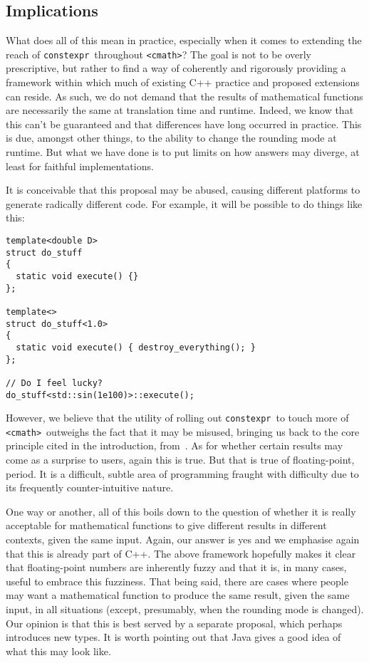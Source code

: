\documentclass[prd,twocolumn,amsmath,amssymb,nofootinbib,eqsecnum]{revtex4-1}
\newcommand{\constexpr}{\code{constexpr}\xspace}
\newcommand{\code}[1]{{\tt #1}}
\newcommand{\header}[1]{{\tt <#1>}}
\newcommand{\cmath}{\header{cmath}}
\begin{document}
\subsection{Implications}

What does all of this mean in practice, especially when it comes to extending the reach of \constexpr\ throughout \cmath? The goal is not to be overly prescriptive, but rather to find a way of coherently and rigorously providing a framework  within which much of existing C++ practice and proposed extensions can reside. As such, we do not demand that the results of mathematical functions are necessarily the same at translation time and runtime. Indeed, we know that this can't be guaranteed and that differences have long occurred in practice. This is due, amongst other things, to the ability to change the rounding mode at runtime. But what we have done is to put limits on how answers may diverge, at least for faithful implementations.

It is conceivable that this proposal may be abused, causing different platforms to generate radically
different code. For example, it will be possible to do things like this:
\begin{verbatim}
template<double D>
struct do_stuff
{
  static void execute() {}
};

template<>
struct do_stuff<1.0>
{
  static void execute() { destroy_everything(); }
};

// Do I feel lucky?
do_stuff<std::sin(1e100)>::execute();
\end{verbatim}

However, we believe that the utility of rolling out \constexpr\ to touch more of \cmath\ outweighs the fact that it may be misused, bringing us back to the core principle cited in the introduction, from~\cite{DandE}.
As for whether certain results may come as a surprise to users, again this is true. But that
is true of floating-point, period. It is a difficult, subtle area of programming fraught with difficulty
due to its frequently counter-intuitive nature.

One way or another, all of this boils down to the question of whether it is really acceptable for mathematical functions to give different results in different contexts, given the same input. Again, our answer is yes and we emphasise again that this is already part of C++. The above framework hopefully makes it clear that floating-point numbers are inherently fuzzy and that it is, in many cases, useful to embrace this fuzziness. That being said, there are cases where people may want a mathematical function to produce the same result, given the same input, in all situations (except, presumably, when the rounding mode is changed). Our opinion is that this is best served by a separate proposal, which
perhaps introduces new types. It is worth pointing out that Java gives a good idea of what this
may look like.
\end{document}
